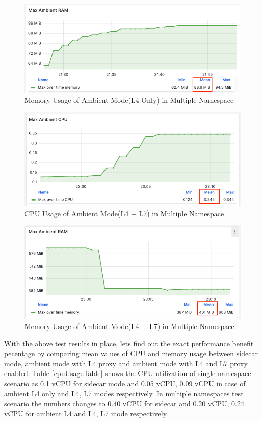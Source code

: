 \begin{figure}[H]
  \centering
  \includegraphics[width=0.85\linewidth]{resources/ambient-multi-ns-l4-mem.png}
  \caption{Memory Usage of Ambient Mode(L4 Only) in Multiple Namespace}
\end{figure}

\begin{figure}[H]
  \centering
  \includegraphics[width=0.85\linewidth]{resources/ambient-multi-ns-l4-l7-cpu.png}
  \caption{CPU Usage of Ambient Mode(L4 + L7) in Multiple Namespace}
\end{figure}

\begin{figure}[H]
  \centering
  \includegraphics[width=0.85\linewidth]{resources/ambient-multi-ns-l4-l7-mem.png}
  \caption{Memory Usage of Ambient Mode(L4 + L7) in Multiple Namespace}
\end{figure}

With the above test results in place, lets find out the exact performance benefit pecentage by comparing mean values of CPU and memory usage between sidecar mode, ambient mode with L4 proxy and ambient mode with L4 and L7 proxy enabled. Table \ref{cpuUsageTable} shows the CPU utilization of single namespace scenario as 0.1 vCPU for sidecar mode and 0.05 vCPU, 0.09 vCPU in case of ambient L4 only and L4, L7 modes respectively. In multiple namespaces test scenario the numbers changes to 0.40 vCPU for sidecar and 0.20 vCPU, 0.24 vCPU for ambient L4 and L4, L7 mode respectively.

